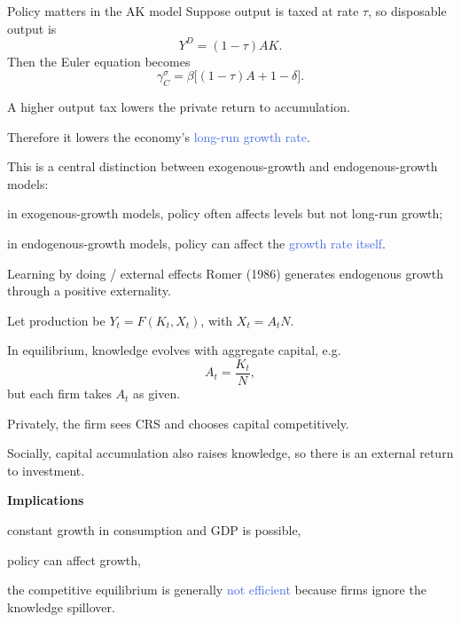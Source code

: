 \documentclass[aspectratio=169,xcolor=dvipsnames]{beamer}
\let\tempone\itemize
\let\temptwo\enditemize
\renewenvironment{itemize}{\tempone\addtolength{\itemsep}{\fill}}{\temptwo}
\let\tempa\enumerate
\let\tempb\endenumerate
\renewenvironment{enumerate}{\tempa\addtolength{\itemsep}{\fill}}{\tempb}
\providecommand{\blue}[1]{\textcolor{RoyalBlue}{#1}}
\begin{document}
\begin{frame}{Policy matters in the AK model}
\small
Suppose output is taxed at rate $\tau$, so disposable output is
\[
Y^D=(1-\tau)AK.
\]
Then the Euler equation becomes
\[
\gamma_C^{\sigma}=\beta\big[(1-\tau)A+1-\delta\big].
\]

\begin{itemize}
    \item A higher output tax lowers the private return to accumulation.
    \item Therefore it lowers the economy's \blue{long-run growth rate}.
    \item This is a central distinction between exogenous-growth and endogenous-growth models:
    \begin{itemize}
        \item in exogenous-growth models, policy often affects levels but not long-run growth;
        \item in endogenous-growth models, policy can affect the \blue{growth rate itself}.
    \end{itemize}
\end{itemize}
\end{frame}

\begin{frame}{Learning by doing / external effects}
\small
Romer (1986) generates endogenous growth through a positive externality.

\begin{itemize}
    \item Let production be \(Y_t=F(K_t,X_t)\), with \(X_t=A_tN\).
    \item In equilibrium, knowledge evolves with aggregate capital, e.g.
    \[
    A_t = \frac{K_t}{N},
    \]
    but each firm takes $A_t$ as given.
    \item Privately, the firm sees CRS and chooses capital competitively.
    \item Socially, capital accumulation also raises knowledge, so there is an external return to investment.
\end{itemize}

\vspace{0.4em}
\textbf{Implications}
\begin{enumerate}
    \item constant growth in consumption and GDP is possible,
    \item policy can affect growth,
    \item the competitive equilibrium is generally \blue{not efficient} because firms ignore the knowledge spillover.
\end{enumerate}
\end{frame}
\end{document}
